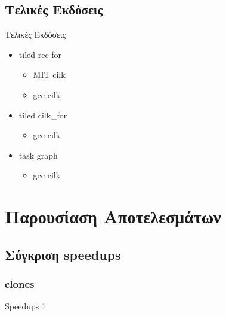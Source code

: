 \documentclass{beamer}
\begin{document}
\subsection{Τελικές Εκδόσεις}
\begin{frame}{Τελικές Εκδόσεις}
    \begin{itemize}
        \item<1-> tiled rec for
            \begin{itemize}
                \item<2-> MIT cilk
                \item<3-> gcc cilk
            \end{itemize}
        \item<4-> tiled cilk\_for
            \begin{itemize}
                \item<5-> gcc cilk
            \end{itemize}
        \item<6-> task graph
            \begin{itemize}
                \item<7-> gcc cilk
            \end{itemize}
    \end{itemize}
\end{frame}



\section{Παρουσίαση Αποτελεσμάτων}

\subsection{Σύγκριση speedups}
\subsubsection{clones}
\begin{frame}
    Speedups 1
\end{frame}
\end{document}
